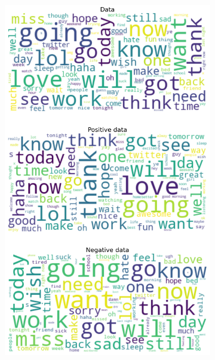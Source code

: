 \documentclass{article}
\begin{document}
\begin{itemize}
\begin{figure}[H]
\begin{subfigure}[b]{0.24\textwidth}
      \includegraphics[width=\textwidth]{chapter-06/section-01-01/08/visualization/2/wordcloud.png}
    \end{subfigure}
    \begin{subfigure}[b]{0.24\textwidth}
      \centering

\end{subfigure}
\end{figure}
\end{itemize}
\end{document}

